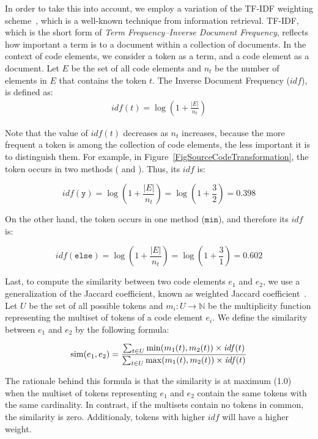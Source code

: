 In order to take this into account, we employ a variation of the TF-IDF weighting scheme~\cite{salton1986introduction}, which is a well-known technique from information retrieval.
TF-IDF, which is the short form of \emph{Term Frequency–Inverse Document Frequency}, reflects how important a term is to a document within a collection of documents.
In the context of code elements, we consider a token as a term, and a code element as a document.
Let $E$ be the set of all code elements and $n_t$ be the number of elements in $E$ that contains the token $t$. The Inverse Document Frequency ($\mathit{idf}$), is defined as:
\begin{align}
\mathit{idf}(t) = \log (1 + \frac{|E|}{n_t})
\end{align}

Note that the value of $\mathit{idf}(t)$ decreases as $n_t$ increases, because the more frequent a token is among the collection of code elements, the less important it is to distinguish them.
For example, in Figure~\ref{FigSourceCodeTransformation}, the token  occurs in two methods ( and ). Thus, its $\mathit{idf}$ is:

\[
\mathit{idf}(\mathtt{y}) = 
\log (1 + \frac{|E|}{n_t}) = 
\log (1 + \frac{3}{2}) = 0.398
\]

On the other hand, the token  occurs in one method ($\mathtt{min}$), and therefore its $\mathit{idf}$ is:

\[
\mathit{idf}(\mathtt{else}) = 
\log (1 + \frac{|E|}{n_t}) = 
\log (1 + \frac{3}{1}) = 0.602
\]

Last, to compute the similarity between two code elements $e_1$ and $e_2$, we use a generalization of the Jaccard coefficient, known as weighted Jaccard coefficient~\cite{chierichetti2010finding}.
Let $U$ be the set of all possible tokens and $m_i: U \to \mathbb{N}$ be the multiplicity function representing the multiset of tokens of a code element $e_i$.
We define the similarity between $e_1$ and $e_2$ by the following formula:


\begin{align}
\label{WJaccard}
\rdsim(e_1, e_2) = \frac{\sum_{t \in U} \min(m_1(t), m_2(t)) \times \mathit{idf}(t) }
                        {\sum_{t \in U} \max(m_1(t), m_2(t)) \times \mathit{idf}(t) }
\end{align}

The rationale behind this formula is that the similarity is at maximum (1.0) when the multiset of tokens representing $e_1$ and $e_2$ contain the same tokens with the same cardinality. In contrast, if the multisets contain no tokens in common, the similarity is zero. Additionaly, tokens with higher $\mathit{idf}$ will have a higher weight.


